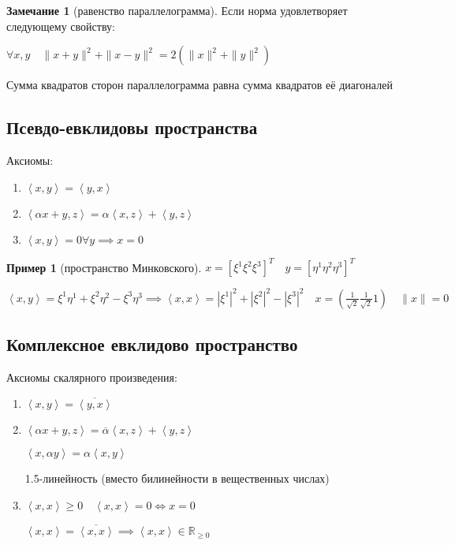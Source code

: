 \documentclass{book}
\newcommand\R{\ensuremath{\mathbb{R}}}
\newcommand{\ov}[1]{\overline{#1}}
\theoremstyle{definition}
\newtheorem*{note}{Замечание}
\newtheorem*{example}{Пример}
\begin{document}
\begin{note}
    [равенство параллелограмма]

    Если норма удовлетворяет следующему свойству:
    
    $\forall x, y\quad \|x + y\|^2 + \|x-y\|^2 = 2\left( \|x\|^2 + \|y\|^2  \right) $

    Сумма квадратов сторон параллелограмма равна сумма квадратов её диагоналей
\end{note}

\subsection{Псевдо-евклидовы пространства}

Аксиомы:
\begin{enumerate}
    \item $\left<x, y \right> = \left<y, x \right>$
    \item $\left<\alpha x + y, z \right> = \alpha \left<x, z \right> + \left<y, z \right>$
    \item $\left<x, y \right> = 0\forall y \implies x = 0$
\end{enumerate}

\begin{example}
    [пространство Минковского]

    $x = \left[ \xi^1 \xi^2 \xi^3 \right]^T \quad y = \left[ \eta^1 \eta^2\eta^3 \right] ^T$

    $\left<x, y \right> = \xi^1\eta^1 + \xi^2\eta^2 - \xi^3\eta^3 \implies \left<x, x \right> = |\xi^1|^2 + |\xi^2|^2 - |\xi^3|^2\quad x = \left( \frac{1}{\sqrt{2} } \frac{1}{\sqrt{2} } 1 \right) \quad \|x\| = 0$
\end{example}

\subsection{Комплексное евклидово пространство}
Аксиомы скалярного произведения:
\begin{enumerate}
    \item $\left<x, y \right> = \ov{\left<y, x \right>}$
    \item $\left<\alpha x + y, z \right> = \ov {\alpha}\left<x, z \right> + \left<y, z \right>$

        $\left<x, \alpha y \right> = \alpha \left<x, y \right>$

        1.5-линейность (вместо билинейности в вещественных числах)
    \item $\left<x, x \right> \geqslant 0\quad \left<x, x \right> = 0 \iff x = 0$
    
        $\left<x, x \right> = \ov{\left<x, x \right>} \implies \left<x, x \right>\in \R_{\geqslant 0}$
\end{enumerate}
\end{document}
